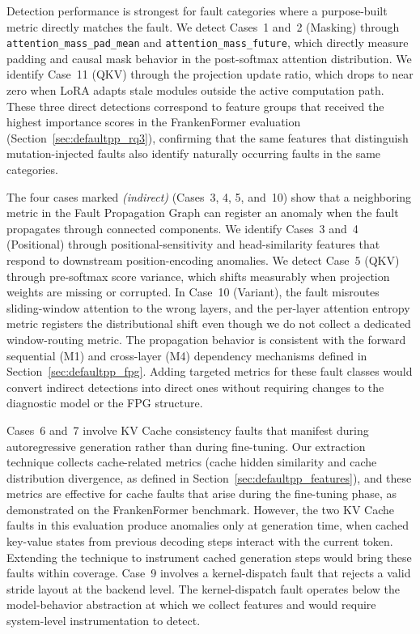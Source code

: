 Detection performance is strongest for fault categories where a purpose-built metric directly matches the fault. We detect Cases~1 and~2 (Masking) through \texttt{attention\_mass\_pad\_mean} and \texttt{attention\_mass\_future}, which directly measure padding and causal mask behavior in the post-softmax attention distribution. We identify Case~11 (QKV) through the projection update ratio, which drops to near zero when LoRA adapts stale modules outside the active computation path. These three direct detections correspond to feature groups that received the highest importance scores in the FrankenFormer evaluation (Section~\ref{sec:defaultpp_rq3}), confirming that the same features that distinguish mutation-injected faults also identify naturally occurring faults in the same categories.

The four cases marked \emph{(indirect)} (Cases~3, 4, 5, and~10) show that a neighboring metric in the Fault Propagation Graph can register an anomaly when the fault propagates through connected components. We identify Cases~3 and~4 (Positional) through positional-sensitivity and head-similarity features that respond to downstream position-encoding anomalies. We detect Case~5 (QKV) through pre-softmax score variance, which shifts measurably when projection weights are missing or corrupted. In Case~10 (Variant), the fault misroutes sliding-window attention to the wrong layers, and the per-layer attention entropy metric registers the distributional shift even though we do not collect a dedicated window-routing metric. The propagation behavior is consistent with the forward sequential (M1) and cross-layer (M4) dependency mechanisms defined in Section~\ref{sec:defaultpp_fpg}. Adding targeted metrics for these fault classes would convert indirect detections into direct ones without requiring changes to the diagnostic model or the FPG structure.

Cases~6 and~7 involve KV Cache consistency faults that manifest during autoregressive generation rather than during fine-tuning. Our extraction technique collects cache-related metrics (cache hidden similarity and cache distribution divergence, as defined in Section~\ref{sec:defaultpp_features}), and these metrics are effective for cache faults that arise during the fine-tuning phase, as demonstrated on the FrankenFormer benchmark. However, the two KV Cache faults in this evaluation produce anomalies only at generation time, when cached key-value states from previous decoding steps interact with the current token. Extending the technique to instrument cached generation steps would bring these faults within coverage. Case~9 involves a kernel-dispatch fault that rejects a valid stride layout at the backend level. The kernel-dispatch fault operates below the model-behavior abstraction at which we collect features and would require system-level instrumentation to detect.

